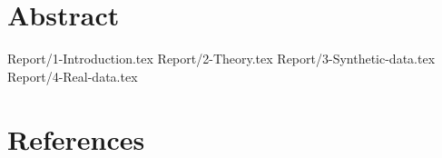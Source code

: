 \documentclass[11pt,a4paper,twoside]{article}
\numberwithin{equation}{section}
\numberwithin{figure}{section}
\begin{document}
\maketitle\thispagestyle{empty}
\clearpage{}

\section*{Abstract}


\clearpage\tableofcontents
\newpage
\printacronyms

\clearpage{}
{Report/1-Introduction.tex}
{Report/2-Theory.tex}
{Report/3-Synthetic-data.tex}
{Report/4-Real-data.tex}


\clearpage
\section*{References}
\printbibliography[heading=none]
%
%
%

\end{document}
